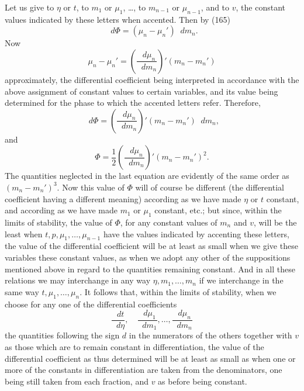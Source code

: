 \documentclass[11pt]{article}
\newcommand{\dd}{\mathop{}\!d}
\begin{document}
Let us give to $\eta$ or $t$, to $m_1$ or $\mu_1$, \ldots, to $m_{n-1}$ or $\mu_{n-1}$, and to $v$, the constant values indicated by these letters when accented. Then by (165)
\begin{equation}
\dd\Phi=(\mu_n-\mu_n')\dd m_n.
\end{equation}
Now
\begin{equation}
\mu_n-\mu_n'=\left(\frac{\dd\mu_n}{\dd m_n}\right)'(m_n-m_n')
\end{equation}
approximately, the differential coefficient being interpreted in accordance with the above assignment of constant values to certain variables, and its value being determined for the phase to which the accented letters refer. Therefore,
\begin{equation}
\dd\Phi=\left(\frac{\dd\mu_n}{\dd m_n}\right)'(m_n-m_n')\dd m_n,
\end{equation}
and
\begin{equation}
\Phi=\frac12\left(\frac{\dd\mu_n}{\dd m_n}\right)'(m_n-m_n')^2.
\end{equation}
The quantities neglected in the last equation are evidently of the same order as $(m_n-m_n')^3$. Now this value of $\Phi$ will of course be different (the differential coefficient having a different meaning) according as we have made $\eta$ or $t$ constant, and according as we have made $m_1$ or $\mu_1$ constant, etc.; but since, within the limits of stability, the value of $\Phi$, for any constant values of $m_n$ and $v$, will be the least when $t,p,\mu_1,\ldots,\mu_{n-1}$ have the values indicated by accenting these letters, the value of the differential coefficient will be at least as small when we give these variables these constant values, as when we adopt any other of the suppositions mentioned above in regard to the quantities remaining constant. And in all these relations we may interchange in any way $\eta,m_1,\ldots,m_n$ if we interchange in the same way $t,\mu_1,\ldots,\mu_n$. It follows that, within the limits of stability, when we choose for any one of the differential coefficients
\begin{equation}
\frac{\dd t}{\dd\eta},\quad \frac{\dd\mu_1}{\dd m_1},\ldots,\frac{\dd\mu_n}{\dd m_n}
\end{equation}
the quantities following the sign $d$ in the numerators of the others together with $v$ as those which are to remain constant in differentiation, the value of the differential coefficient as thus determined will be at least as small as when one or more of the constants in differentiation are taken from the denominators, one being still taken from each fraction, and $v$ as before being constant.
\end{document}
